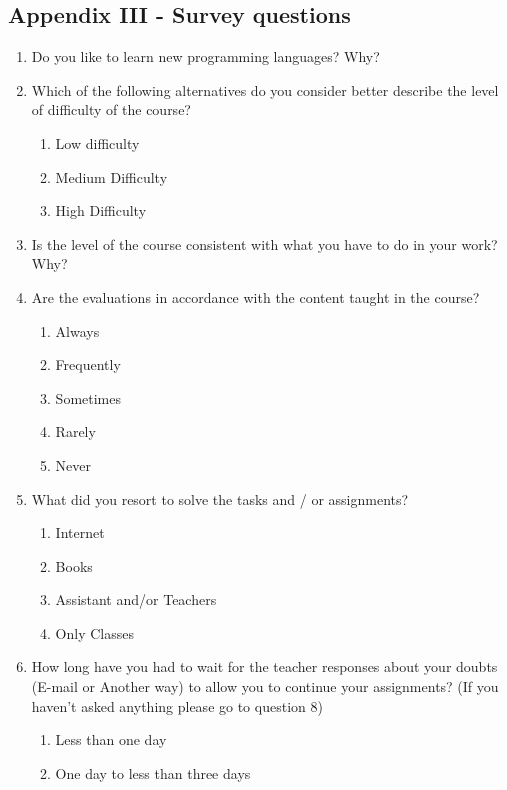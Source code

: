 \documentclass[letter, 10pt]{article}
\begin{document}
\subsection{Appendix III - Survey questions}
\label{cap:survey}
\begin{footnotesize}
\begin{enumerate}
    \item Do you like to learn new programming languages? Why?
    \item Which of the following alternatives do you consider better describe the level of difficulty of the course?
    \begin{enumerate}
        \item Low difficulty
        \item Medium Difficulty
        \item High Difficulty
    \end{enumerate}
    \item Is the level of the course consistent with what you have to do in your work? Why?
    \item Are the evaluations in accordance with the content taught in the course?
    \begin{enumerate}
        \item Always
        \item Frequently
        \item Sometimes
        \item Rarely
        \item Never
    \end{enumerate}
    \item  What did you resort to solve the tasks and / or assignments?
    \begin{enumerate}
        \item Internet
        \item Books
        \item Assistant and/or Teachers
        \item Only Classes
    \end{enumerate}
    \item How long have you had to wait for the teacher responses about your doubts (E-mail or Another way) to allow you to continue your assignments?
          (If you haven’t asked anything please go to question 8)
    \begin{enumerate}
        \item Less than one day
        \item One day to less than three days

\end{enumerate}
\end{enumerate}
\end{footnotesize}
\end{document}

